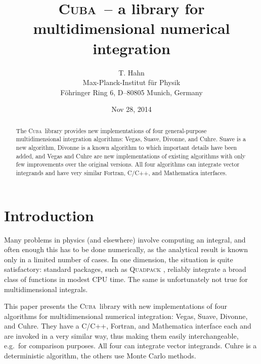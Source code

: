 \documentclass[12pt]{article}
\makeatletter
\newcommand\cuba{\textsc{Cuba}}
\newcommand\eg{e.g.\ }
\def\reportno#1{\gdef\@reportno{#1}}
\makeatother
\begin{document}
\reportno{MPP--2004--40\\hep--ph/0404043}

\title{\cuba\ -- a library for multidimensional numerical integration}

\author{T. Hahn \\
Max-Planck-Institut f\"ur Physik \\
F\"ohringer Ring 6, D--80805 Munich, Germany}

\date{Nov 28, 2014}

\maketitle

\begin{abstract}
The \cuba\ library provides new implementations of four general-purpose
multidimensional integration algorithms: Vegas, Suave, Divonne, and
Cuhre.  Suave is a new algorithm, Divonne is a known algorithm to which
important details have been added, and Vegas and Cuhre are new
implementations of existing algorithms with only few improvements over
the original versions.  All four algorithms can integrate vector
integrands and have very similar Fortran, C/C++, and Mathematica
interfaces.
\end{abstract}


\section{Introduction}

Many problems in physics (and elsewhere) involve computing an integral,
and often enough this has to be done numerically, as the analytical
result is known only in a limited number of cases.  In one dimension,
the situation is quite satisfactory: standard packages, such as
\textsc{Quadpack} \cite{quadpack}, reliably integrate a broad class of
functions in modest CPU time.  The same is unfortunately not true for
multidimensional integrals.

This paper presents the \cuba\ library with new implementations of four
algorithms for multidimensional numerical integration: Vegas, Suave,
Divonne, and Cuhre.  They have a C/C++, Fortran, and Mathematica
interface each and are invoked in a very similar way, thus making them
easily interchangeable, \eg for comparison purposes.  All four can
integrate vector integrands.  Cuhre is a deterministic algorithm, the
others use Monte Carlo methods.
\end{document}
